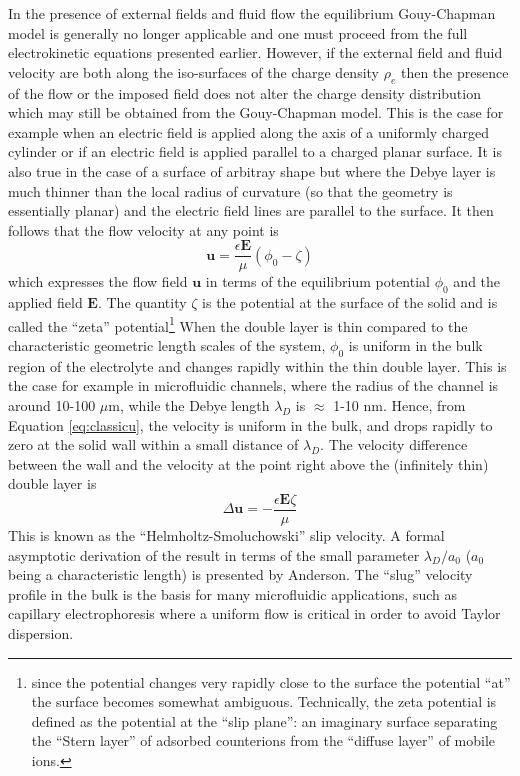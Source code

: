 In the presence of external fields and fluid flow the equilibrium Gouy-Chapman model is generally no longer applicable and one must proceed from the full electrokinetic equations presented earlier. However, if the external field and fluid velocity are both along the iso-surfaces of the charge density $\rho_e$ then the presence of the flow or the imposed field does not alter the charge density distribution which may still be obtained from the Gouy-Chapman model. This is the case for example when an electric field is applied along the axis of a uniformly charged cylinder or if an electric field is applied parallel to a charged planar surface. It is also true in the case of a surface of arbitray shape but where the Debye layer is much thinner than the local radius of curvature (so that the geometry is essentially planar) and the electric field lines are parallel to the surface. 
It then follows that the flow 
velocity at any point is 
\begin{equation}
\mathbf{u} = \frac{\epsilon \mathbf{E}}{\mu}\left(\phi_0 - \zeta\right)
\label{eq:classicu}
\end{equation}
which expresses the flow field $\mathbf{u}$ in terms of the equilibrium potential $\phi_0$ and the applied field 
$\mathbf{E}$. The quantity 
$\zeta$ is the potential at the surface of the solid and is called the ``zeta'' potential\footnote{since the potential 
changes very rapidly close to the surface the potential ``at'' the surface becomes somewhat ambiguous. Technically,
the zeta potential is defined as the potential at the ``slip plane'': an imaginary 
surface separating the ``Stern layer''  of adsorbed counterions from the ``diffuse layer'' of mobile ions.}
When the double layer is thin compared to the characteristic geometric length scales of the system, $\phi_0$ is uniform in the bulk region of the electrolyte and changes rapidly within the thin double layer. This is the case for example in 
microfluidic channels, where the radius of the channel is around 10-100 $\mu$m, while the Debye length $\lambda_D$ is 
$\approx$ 1-10 nm. Hence, from Equation \ref{eq:classicu}, the velocity is uniform in the bulk, and drops rapidly to zero at the solid wall within a small distance of $\lambda_D$. The velocity difference between the wall and the velocity at the point right above the (infinitely thin) double layer is
\begin{equation}
\Delta \mathbf{u} = -\frac{\epsilon \mathbf{E} \zeta}{\mu}
\label{eq:HSslip}
\end{equation}
This is known as the ``Helmholtz-Smoluchowski'' slip velocity\cite{Helmholtz,Smoluchowski1924}. A formal asymptotic derivation of the result in terms of the small parameter $\lambda_D/a_0$ ($a_0$ being a characteristic length) is presented by Anderson\cite{anderson1985effect}. The ``slug'' velocity profile in the bulk is the basis for many microfluidic applications, such as capillary electrophoresis\cite{ghosal2006electrokinetic} where a uniform flow is critical in order to avoid Taylor dispersion.

